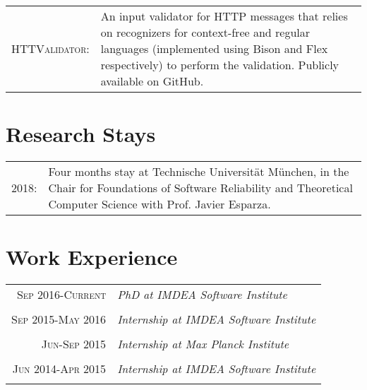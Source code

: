\documentclass[a4paper,10pt]{article} %
\begin{document}
\begin{tabular}{rp{11cm}}
\textsc{HTTValidator}: & An input validator for HTTP messages that relies on recognizers for context-free and regular languages (implemented using Bison and Flex respectively) to perform the validation. Publicly available on GitHub. \\
\end{tabular}


\section{Research Stays}

\begin{tabular}{rp{13cm}}
\textsc{2018}: & Four months stay at Technische Universität München, in the Chair for Foundations of Software Reliability and Theoretical Computer Science with Prof. Javier Esparza. \\
\end{tabular}


\section{Work Experience}

\begin{tabular}{r|p{11cm}}
\textsc{Sep 2016-Current} & \emph{PhD at IMDEA Software Institute}\\
\multicolumn{2}{c}{} \\

\textsc{Sep 2015-May 2016} & \emph{Internship at IMDEA Software Institute}\\
\multicolumn{2}{c}{} \\

\textsc{Jun-Sep 2015} & \emph{Internship at Max Planck Institute}\\
\multicolumn{2}{c}{} \\

\textsc{Jun 2014-Apr 2015} & \emph{Internship at IMDEA Software Institute}\\
\multicolumn{2}{c}{} \\
\end{tabular}
\end{document}
